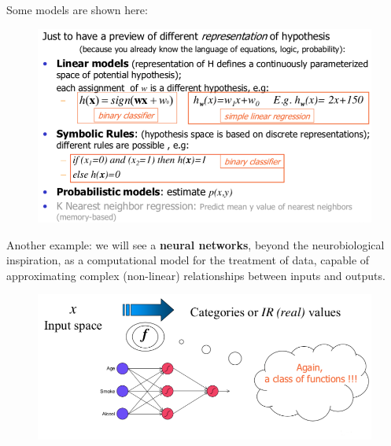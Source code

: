 \documentclass[../main.tex]{subfiles}
\begin{document}
Some models are shown here:
\begin{figure}[H]
    \centering
    \includegraphics[scale = 0.4]{lectures/1_Introduction/intro_trivial_model_eg.png}
\end{figure}

Another example: we will see a \textbf{neural networks}, beyond the neurobiological inspiration, as a computational model for the treatment of data, capable of approximating complex (non-linear) relationships between inputs and outputs.
\begin{figure}[H]
    \centering
    \includegraphics[scale = 0.35]{lectures/1_Introduction/intro_nn.png}
\end{figure}
\end{document}
